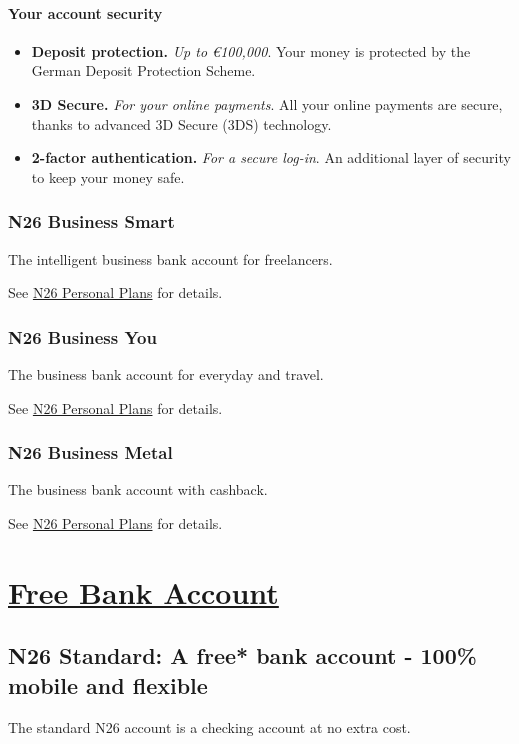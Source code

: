 \documentclass[onsided]{book}
\numberwithin{equation}{section}
\begin{document}
\subsubsection{Your account security}
\begin{itemize}
    \item \textbf{Deposit protection.} \textit{Up to €100,000}. Your money is protected by the German Deposit Protection Scheme.
    \item \textbf{3D Secure.} \textit{For your online payments}. All your online payments are secure, thanks to advanced 3D Secure (3DS) technology.
    \item \textbf{2-factor authentication.} \textit{For a secure log-in}. An additional layer of security to keep your money safe.
\end{itemize}

\subsection{N26 Business Smart}
The intelligent business bank account for freelancers.

See \href{https://n26.com/en-de/plans-business}{N26 Personal Plans} for details.

\subsection{N26 Business You}
The business bank account for everyday and travel.

See \href{https://n26.com/en-de/plans-business}{N26 Personal Plans} for details.

\subsection{N26 Business Metal}
The business bank account with cashback.

See \href{https://n26.com/en-de/plans-business}{N26 Personal Plans} for details.


\chapter{\href{https://n26.com/en-de/free-bank-account}{Free Bank Account}}

\section{N26 Standard: A free* bank account - 100\% mobile and flexible}
The standard N26 account is a checking account at no extra cost.
\end{document}
